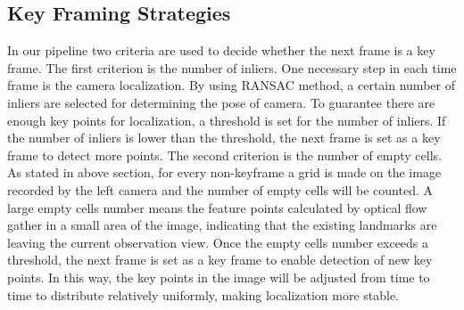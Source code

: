 \documentclass[11pt]{easychair}
\begin{document}
\subsection{Key Framing Strategies}
In our pipeline two criteria are used to decide whether the next frame is a key frame. The first criterion is the number of inliers. One necessary step in each time frame is the camera localization. By using RANSAC method, a certain number of inliers are selected for determining the pose of camera. To guarantee there are enough key points for localization, a threshold is set for the number of inliers. If the number of inliers is lower than the threshold, the next frame is set as a key frame to detect more points. The second criterion is the number of empty cells. As stated in above section, for every non-keyframe a grid is made on the image recorded by the left camera and the number of empty cells will be counted. A large empty cells number means the feature points calculated by optical flow gather in a small area of the image, indicating that the existing landmarks are leaving the current observation view. Once the empty cells number exceeds a threshold, the next frame is set as a key frame to enable detection of new key points. In this way, the key points in the image will be adjusted from time to time to distribute relatively uniformly, making localization more stable.
\end{document}
